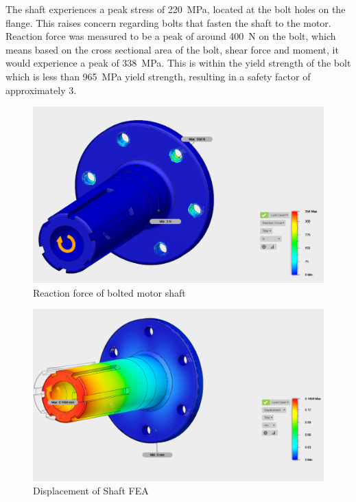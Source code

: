 \documentclass[main.tex]{subfiles}
\begin{document}
    The shaft experiences a peak stress of \SI{220}{MPa}, located at the bolt holes on the flange. This raises concern regarding bolts that fasten the shaft to the motor. Reaction force was measured to be a peak of around \SI{400}{N} on the bolt, which means based on the cross sectional area of the bolt, shear force and moment, it would experience a peak of \SI{338}{MPa}. This is within the yield strength of the bolt which is less than \SI{965}{MPa} yield strength, resulting in a safety factor of approximately 3.\\

    \begin{figure}
        \centering
        \includegraphics[width=\linewidth]{images/fig13}
        \caption{Reaction force of bolted motor shaft}
    \end{figure}
    \begin{figure}[H]
        \centering
        \includegraphics[width=\linewidth]{images/fig14}
        \caption{Displacement of Shaft FEA}
        \label{fig:shaft-stress1}
    \end{figure}
\end{document}
